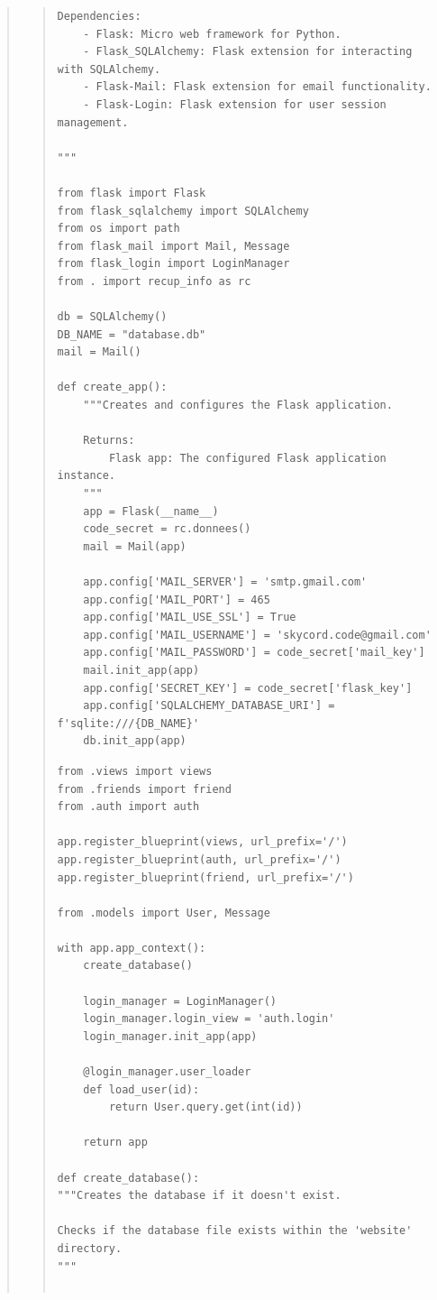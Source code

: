 \documentclass{article}
\begin{document}
\begin{quote}
\begin{quote}
\begin{tcolorbox}[colback=grisClair,colframe=black]
\begin{lstlisting}
Dependencies:
    - Flask: Micro web framework for Python.
    - Flask_SQLAlchemy: Flask extension for interacting with SQLAlchemy.
    - Flask-Mail: Flask extension for email functionality.
    - Flask-Login: Flask extension for user session management.

"""

from flask import Flask
from flask_sqlalchemy import SQLAlchemy
from os import path
from flask_mail import Mail, Message
from flask_login import LoginManager
from . import recup_info as rc

db = SQLAlchemy()
DB_NAME = "database.db"
mail = Mail()

def create_app():
    """Creates and configures the Flask application.

    Returns:
        Flask app: The configured Flask application instance.
    """
    app = Flask(__name__)
    code_secret = rc.donnees()
    mail = Mail(app)

    app.config['MAIL_SERVER'] = 'smtp.gmail.com'
    app.config['MAIL_PORT'] = 465
    app.config['MAIL_USE_SSL'] = True
    app.config['MAIL_USERNAME'] = 'skycord.code@gmail.com'
    app.config['MAIL_PASSWORD'] = code_secret['mail_key']
    mail.init_app(app)
    app.config['SECRET_KEY'] = code_secret['flask_key']
    app.config['SQLALCHEMY_DATABASE_URI'] = f'sqlite:///{DB_NAME}'
    db.init_app(app)
    \end{lstlisting}
\end{tcolorbox}  
\begin{tcolorbox}[colback=grisClair,colframe=black]
    \begin{lstlisting}
from .views import views
from .friends import friend
from .auth import auth

app.register_blueprint(views, url_prefix='/')
app.register_blueprint(auth, url_prefix='/')
app.register_blueprint(friend, url_prefix='/')

from .models import User, Message

with app.app_context():
    create_database()

    login_manager = LoginManager() 
    login_manager.login_view = 'auth.login'
    login_manager.init_app(app)

    @login_manager.user_loader
    def load_user(id):
        return User.query.get(int(id))

    return app

def create_database():
"""Creates the database if it doesn't exist.

Checks if the database file exists within the 'website' directory.
"""


\end{lstlisting}
\end{tcolorbox}
\end{quote}
\end{quote}
\end{document}
